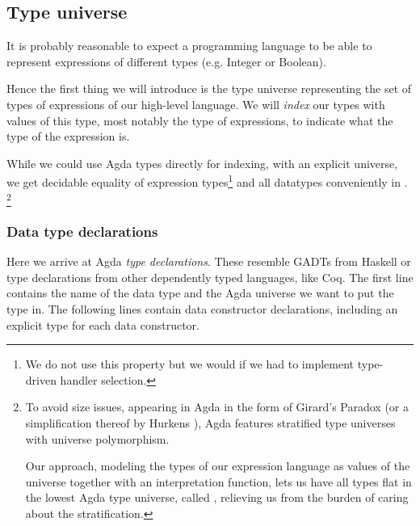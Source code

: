 

\subsection{Type universe}

It is probably reasonable to expect a programming language to be able to represent
expressions of different types (e.g. Integer or Boolean).

Hence the first thing we will introduce is the type universe representing the set of
types of expressions of our high-level language. We will \emph{index} our types with
values of this type, most notably the type  of expressions, to
indicate what the type of the expression is.

While we could use Agda
types directly for indexing, with an explicit universe, we get decidable
equality of expression types\footnote{We do not use this property but we would
if we had to implement type-driven handler selection.} and all datatypes conveniently
in .%
\footnote{To avoid size issues, appearing in Agda in the form of Girard's Paradox
\cite{girard:dissertation} (or a simplification thereof by Hurkens \cite{hurkens}),
Agda features stratified type universes with universe polymorphism.

Our approach, modeling the types of our expression language as values
of the universe  together with an interpretation function,
lets us have all types flat in the lowest Agda type
universe, called , relieving us from the burden of caring about the
stratification.}


\subsubsection{Data type declarations}

Here we arrive at Agda \emph{type declarations}. These resemble GADTs from
Haskell or type declarations from other dependently typed languages, like Coq.
The first line contains the name of the data type and the Agda universe we want to
put the type in. The following lines contain data constructor declarations,
including an explicit type for each data constructor.

